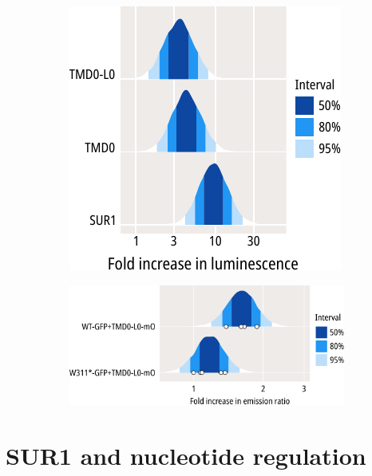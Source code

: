 \begin{figure}[h]
\begin{subfigure}[t]{0.45\textwidth}
	\end{subfigure}
	\vfill
	\begin{subfigure}[t]{0.45\textwidth}
		\caption{}\label{ch6fig:tmd0s_surface_expression_3}
		\centering
		\includegraphics[width=\textwidth]{tmd0s_surface_expression_3.pdf}
	\end{subfigure}
	\hfill
	\begin{subfigure}[t]{0.45\textwidth}
		\caption{}\label{ch6fig:gfp_ofp_contrasts_2}
		\centering
		\includegraphics[width=\textwidth]{gfp_ofp_contrasts_2.pdf}
	\end{subfigure}
	\caption[TMD0 and TMD0-LO associate with WT-GFP and W311*-GFP]{
	}\label{ch6fig:tmd0_assays}
\end{figure}

\section{SUR1 and nucleotide regulation}

